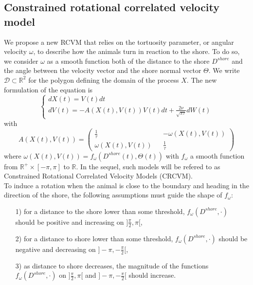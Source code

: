 \documentclass[aoas]{imsart}
\theoremstyle{definition}
\theoremstyle{remark}
\theoremstyle{remark}
\newcommand {\R}{\mathbb{R}}
\newcommand {\1}{\mathbb{1}}
\begin{document}
\subsection{Constrained rotational correlated velocity model}
\label{section: CRCVM}

We propose a new RCVM that relies on the tortuosity parameter, or angular velocity $\omega$, to describe how the animals turn in reaction to the shore. 
To do so, we consider $\omega$ as a smooth function both of the distance to the shore $D^{shore}$ and the angle between the velocity vector and the shore normal vector $\Theta$. 
We write $\mathcal{D} \subset \R^2$ for the polygon defining the domain of the process $X$. The new formulation of the equation is 
\begin{equation} \left\{
	\begin{array}{l}
		dX(t)=V(t) dt \\
		dV(t)=-A(X(t),V(t))V(t)dt+\frac{2\nu}{\sqrt{\pi \tau}} dW(t) 
		
	\end{array}
	\right.
	\label{eq: CRCVM equation}
\end{equation}
with 
\begin{equation} 
	A(X(t),V(t))=\begin{pmatrix} 
		\frac{1}{\tau} && -\omega(X(t),V(t)) \\
		\omega(X(t),V(t)) && \frac{1}{\tau}
	\end{pmatrix}
	\label{eq: CRCVM matrix A}
\end{equation}
where $\omega(X(t),V(t))=f_{\omega}(D^{shore}(t),\Theta(t))$ with  $f_{\omega}$ a smooth function from $\R^{+} \times [-\pi,\pi]$ to $\R$. In the sequel, such models will be refered to as Constrained Rotational Correlated Velocity Models (CRCVM).\\

To induce a rotation when the animal is close to the boundary and heading in the direction of the shore,
the following assumptions must guide the shape of $f_{\omega}$:
\begin{itemize}
	\item[1)] for a distance to the shore lower than some threshold, $f_{\omega}(D^{shore},\cdot)$ should be positive and increasing on $]\frac{\pi}{2},\pi[$, 
	\item[2)] for a distance to shore  lower than some threshold, $f_{\omega}(D^{shore},\cdot)$ should be negative and decreasing on $]-\pi,-\frac{\pi}{2}[$,
	\item[3)] as distance to shore decreases, the magnitude of the functions  $f_{\omega}(D^{shore},\cdot)$ on $]\frac{\pi}{2},\pi[$  and $]-\pi,-\frac{\pi}{2}[$ should increase.
\end{itemize} 
\end{document}
